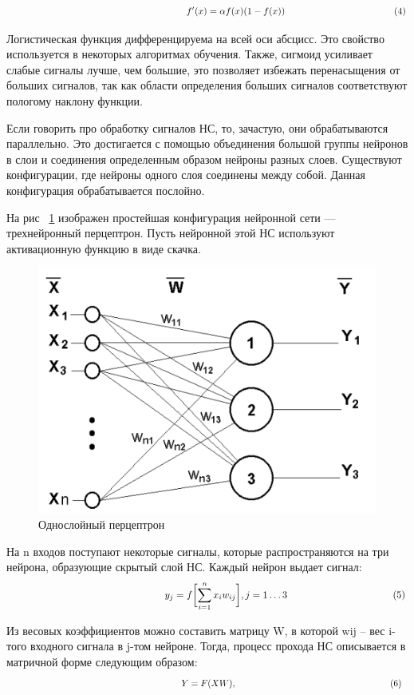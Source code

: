 \documentclass[a4paper,english,russian]{G2-105}
\begin{document}
\[
\ \hspace*{66mm} f'(x) = \alpha f(x) (1 - f(x)) \ \hspace*{40mm} (4)
\] 
\par Логистическая функция дифференцируема на всей оси абсцисс. Это свойство используется в некоторых алгоритмах обучения. Также, сигмоид усиливает слабые сигналы лучше, чем большие, это позволяет избежать перенасыщения от больших сигналов, так как области определения больших сигналов соответствуют пологому наклону функции.   
\par Если говорить про обработку сигналов НС, то, зачастую, они обрабатываются параллельно. Это достигается с помощью объединения большой группы нейронов в слои и соединения определенным образом нейроны разных слоев. Существуют конфигурации, где нейроны одного слоя соединены между собой. Данная конфигурация обрабатывается послойно.
\par На рис ~\ref{perceptron} изображен простейшая конфигурация нейронной сети --- трехнейронный перцептрон. Пусть нейронной этой НС используют активационную функцию в виде скачка. 
\begin{figure}
\begin{center}
    \includegraphics[width=0.4\linewidth]{perceptron.png}
    \caption{Однослойный перцептрон}
	\label{perceptron}
\end{center}
\end{figure}
\par На n входов поступают некоторые сигналы, которые распространяются на три нейрона, образующие скрытый слой НС. Каждый нейрон выдает сигнал:
\[
\ \hspace*{55mm} y_j = f\biggl[\sum_{i=1}^n x_i w_{ij} \biggr], j=1 \dots 3  \ \hspace*{37mm} (5)
\] 
\par Из весовых коэффициентов можно составить матрицу W, в которой wij -- вес i-того входного сигнала в j-том нейроне. Тогда, процесс прохода НС описывается в матричной форме следующим образом:
\[
\ \hspace*{65mm} Y=F(XW),  \ \hspace*{59mm} (6)
\] 
\end{document}
